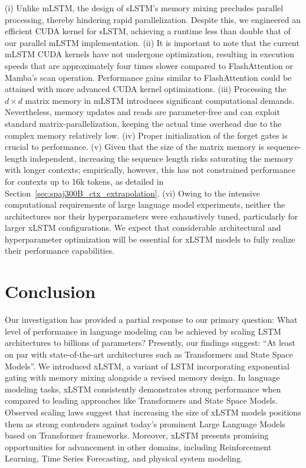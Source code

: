 (i) Unlike mLSTM, the design of sLSTM's memory mixing precludes parallel processing, thereby hindering rapid parallelization. Despite this, we engineered an efficient CUDA kernel for sLSTM, achieving a runtime less than double that of our parallel mLSTM implementation. (ii) It is important to note that the current mLSTM CUDA kernels have not undergone optimization, resulting in execution speeds that are approximately four times slower compared to FlashAttention or Mamba's scan operation. Performance gains similar to FlashAttention could be attained with more advanced CUDA kernel optimizations. (iii) Processing the $d \times d$ matrix memory in mLSTM introduces significant computational demands. Nevertheless, memory updates and reads are parameter-free and can exploit standard matrix-parallelization, keeping the actual time overhead due to the complex memory relatively low. (iv) Proper initialization of the forget gates is crucial to performance. (v) Given that the size of the matrix memory is sequence-length independent, increasing the sequence length risks saturating the memory with longer contexts; empirically, however, this has not constrained performance for contexts up to 16k tokens, as detailed in Section~\ref{sec:spaj300B_ctx_extrapolation}. (vi) Owing to the intensive computational requirements of large language model experiments, neither the architectures nor their hyperparameters were exhaustively tuned, particularly for larger xLSTM configurations. We expect that considerable architectural and hyperparameter optimization will be essential for xLSTM models to fully realize their performance capabilities.

\section{Conclusion}
Our investigation has provided a partial response to our primary question: What level of performance in language modeling can be achieved by scaling LSTM architectures to billions of parameters? Presently, our findings suggest: ``At least on par with state-of-the-art architectures such as Transformers and State Space Models''. We introduced xLSTM, a variant of LSTM incorporating exponential gating with memory mixing alongside a revised memory design. In language modeling tasks, xLSTM consistently demonstrates strong performance when compared to leading approaches like Transformers and State Space Models. Observed scaling laws suggest that increasing the size of xLSTM models positions them as strong contenders against today's prominent Large Language Models based on Transformer frameworks. Moreover, xLSTM presents promising opportunities for advancement in other domains, including Reinforcement Learning, Time Series Forecasting, and physical system modeling.

